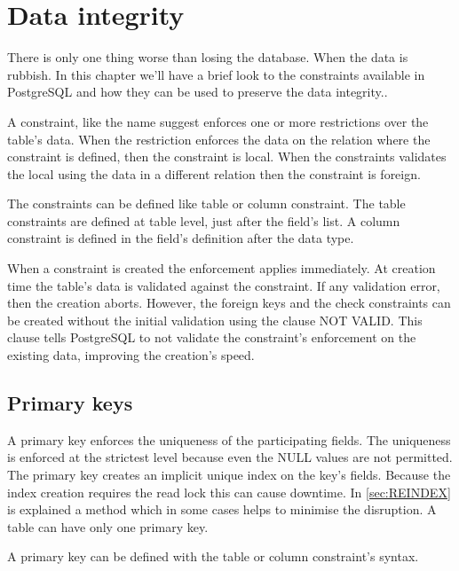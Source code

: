 \chapter{Data integrity}
\label{cha:DATAINT}
There is only one thing worse than losing the database. When the data is rubbish. In this chapter we'll
have a brief look to the constraints available in PostgreSQL and how they can be used to preserve the
data integrity..\newline

A constraint, like the name suggest enforces one or more restrictions over the
table's data. When the restriction enforces the data on the relation where the constraint is defined,
then the constraint is local. When the constraints validates the local using the data in a different
relation then the constraint is foreign.\newline

The constraints can be defined like table or column constraint. The table constraints are defined at
table level, just after the field's list. A column constraint is defined in the field's definition after
the data type.\newline

When a constraint is created the enforcement applies immediately. At creation time the table's data is
validated against the constraint. If any validation error, then the creation aborts. However, the foreign
keys and the check constraints can be created without the initial validation using the clause NOT
VALID. This clause tells PostgreSQL to not validate the constraint's
enforcement on the existing data, improving the creation's speed.

\section{Primary keys} 
A primary key enforces the uniqueness of the participating fields. The uniqueness is enforced at
the strictest level because even the NULL values are not permitted. The primary key creates an implicit
unique index on the key's fields. Because the index creation requires the read lock this can cause
downtime. In \ref{sec:REINDEX} is explained a method which in some cases helps to minimise the
disruption. A table can have only one primary key.\newline

A primary key can be defined with the table or column constraint's syntax.

